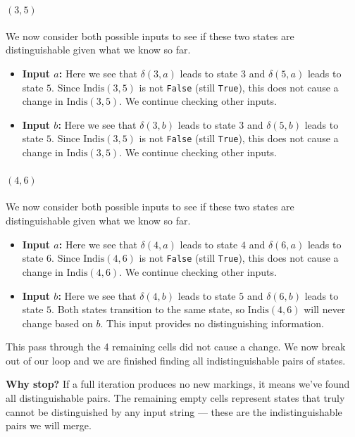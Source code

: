 \documentclass{article}
\begin{document}
\paragraph{$(3, 5)$} We now consider both possible inputs to see if these two states are distinguishable given what we know so far.
\begin{itemize}[itemsep=0.3em]
\item \textbf{Input $a$:} Here we see that $\delta(3, a)$ leads to state $3$ and $\delta(5, a)$ leads to state $5$.
  Since $\text{Indis}(3, 5)$ is not \texttt{False} (still \texttt{True}), this does not cause a change in $\text{Indis}(3, 5)$. We continue checking other inputs.
\item \textbf{Input $b$:} Here we see that $\delta(3, b)$ leads to state $3$ and $\delta(5, b)$ leads to state $5$.
  Since $\text{Indis}(3, 5)$ is not \texttt{False} (still \texttt{True}), this does not cause a change in $\text{Indis}(3, 5)$. We continue checking other inputs.
\end{itemize}
\paragraph{$(4, 6)$} We now consider both possible inputs to see if these two states are distinguishable given what we know so far.
\begin{itemize}[itemsep=0.3em]
\item \textbf{Input $a$:} Here we see that $\delta(4, a)$ leads to state $4$ and $\delta(6, a)$ leads to state $6$.
  Since $\text{Indis}(4, 6)$ is not \texttt{False} (still \texttt{True}), this does not cause a change in $\text{Indis}(4, 6)$. We continue checking other inputs.
\item \textbf{Input $b$:} Here we see that $\delta(4, b)$ leads to state $5$ and $\delta(6, b)$ leads to state $5$.
  Both states transition to the same state, so $\text{Indis}(4, 6)$ will never change based on $b$. This input provides no distinguishing information.
\end{itemize}


\vspace{0.5em}
\noindent This pass through the 4 remaining cells did not cause a change. We now break out of our loop and we are finished finding all indistinguishable pairs of states.

\textbf{Why stop?} If a full iteration produces no new markings, it means we've found all distinguishable pairs. The remaining empty cells represent states that truly cannot be distinguished by any input string — these are the indistinguishable pairs we will merge.
\end{document}
